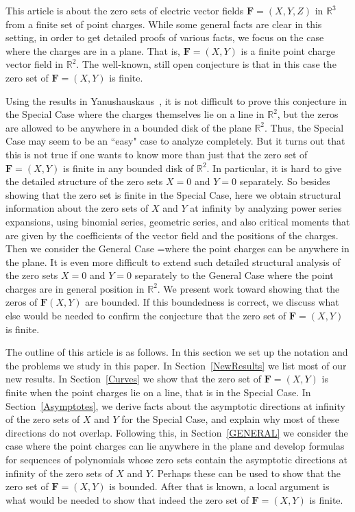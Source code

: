 \documentclass{article}
\theoremstyle{remark}
\numberwithin{equation}{section}
\begin{document}
This article is about the zero sets of electric vector fields ${\mathbf F}=(X,Y,Z)$ in ${\mathbb R}^3$ from a finite set of point charges.  
While some general facts are clear in this setting, in order to get detailed proofs of various facts, we focus on the case where the charges are 
in a plane.  That is, ${\mathbf F}=(X,Y)$ is a finite point charge vector field in ${\mathbb R}^2$.  The well-known, still open conjecture is that in 
this case the zero set of ${\mathbf F}=(X,Y)$ is finite.  

Using the results in Yanushauskaus~\cite{Jan}, it is not difficult to prove this conjecture in the Special Case where the charges themselves lie on a 
line in ${\mathbb R}^2$, but the zeros are allowed to be anywhere in a bounded disk of the plane ${\mathbb R}^2$.  Thus, the Special Case may seem to be an ``easy" case to 
analyze completely.  But it turns out that this is not true if one wants to know more than just that the zero set of ${\mathbf F}=(X,Y)$ is finite in any bounded disk 
of ${\mathbb R}^2$. In particular, it is hard to give the detailed structure of the zero sets $X=0$ and $Y=0$ separately.  So besides showing that the zero set is finite in 
the Special Case, here we obtain structural information about the zero sets of $X$ and $Y$ at infinity by analyzing power series expansions, using binomial series, 
geometric series, and also critical moments that are given by the coefficients of the vector field and the positions of the charges.  Then we consider the General Case 
=where the point charges can be anywhere in the plane.  It is even more difficult to extend such detailed structural analysis of the zero sets $X=0$ and $Y=0$ separately 
to the General Case where the point charges are in general position in ${\mathbb R}^2$.  We present work toward showing that the zeros of ${\mathbf F}(X,Y)$ are bounded. 
If this boundedness is correct, we discuss what else would be needed to confirm the conjecture that the zero set of ${\mathbf F}=(X,Y)$ is finite.   

The outline of this article is as follows.  In this section we set up the notation and the problems we study in this paper. In Section~\ref{NewResults} 
we list most of our new results. In Section~\ref{Curves} we show that the 
zero set of ${\mathbf F}=(X,Y)$ is finite when the point charges lie on a line, that is in the Special Case.  In Section~\ref{Asymptotes}, we derive facts about the asymptotic directions at infinity of the zero sets of $X$ and $Y$ for the Special Case, and explain why most of these directions do not overlap.  Following this, in Section~\ref{GENERAL} we consider the case where the point charges can lie anywhere in the plane and develop formulas for sequences of polynomials whose zero sets contain the asymptotic directions at infinity of the zero sets of $X$ and $Y$.  Perhaps these can be used to show that the zero set of ${\mathbf F}=(X,Y)$ is bounded.  After that is known, a local argument is what would be needed to show that indeed the zero set of ${\mathbf F}=(X,Y)$ is finite.
\end{document}
